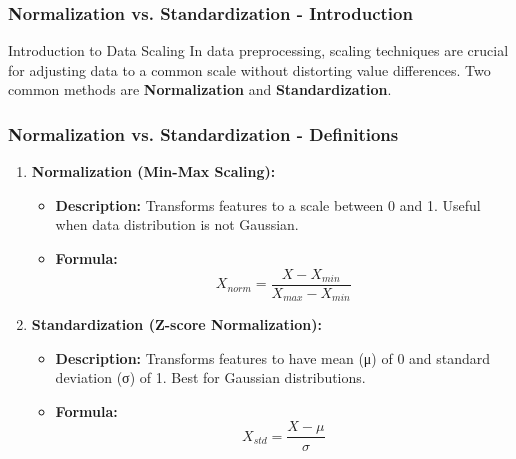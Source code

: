 \documentclass[aspectratio=169]{beamer}
\begin{document}
\begin{frame}[fragile]
    \frametitle{Normalization vs. Standardization - Introduction}
    \begin{block}{Introduction to Data Scaling}
        In data preprocessing, scaling techniques are crucial for adjusting data to a common scale without distorting value differences. Two common methods are \textbf{Normalization} and \textbf{Standardization}.
    \end{block}
\end{frame}

\begin{frame}[fragile]
    \frametitle{Normalization vs. Standardization - Definitions}
    \begin{enumerate}
        \item \textbf{Normalization (Min-Max Scaling):}
            \begin{itemize}
                \item \textbf{Description:} Transforms features to a scale between 0 and 1. Useful when data distribution is not Gaussian.
                \item \textbf{Formula:} 
                \begin{equation}
                    X_{norm} = \frac{X - X_{min}}{X_{max} - X_{min}}
                \end{equation}
            \end{itemize}
            \item \textbf{Standardization (Z-score Normalization):}
            \begin{itemize}
                \item \textbf{Description:} Transforms features to have mean (μ) of 0 and standard deviation (σ) of 1. Best for Gaussian distributions.
                \item \textbf{Formula:} 
                \begin{equation}
                    X_{std} = \frac{X - \mu}{\sigma}
                \end{equation}
            \end{itemize}
    \end{enumerate}
\end{frame}
\end{document}
